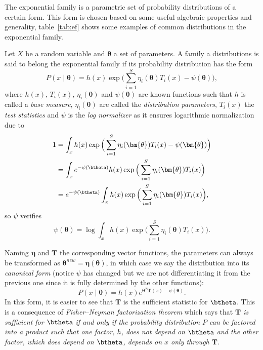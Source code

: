 
The exponential family is a parametric set of probability distributions of a certain form. This form is chosen based on some useful algebraic properties and generality, table~\ref{tab:ef} shows some examples of common distributions in the exponential family.

Let \(X\) be a random variable and \(\bm{\theta}\) a set of parameters. A family a distributions is said to belong the exponential family if its probability distribution has the form
\[
  P(x \mid \bm{\theta}) = h(x)\exp{\Big( \sum_{i=1}^{S} \eta_{i}(\bm{\theta})T_{i}(x) - \psi(\bm{\theta}) \Big)},
\]
where \(h(x)\), \(T_{i}(x)\), \(\eta_{i}(\bm{\theta})\) and \(\psi(\bm{\theta})\)  are known functions such that \(h\) is called a \emph{base measure}, \(\eta_{i}(\bm{\theta})\) are called the \emph{distribution parameters},  \(T_{i}(x)\) the \emph{test statistics} and \(\psi\) is the \emph{log normalizer} as it ensures logarithmic normalization due to
\[
  \begin{aligned}
    1 &= \int_{x}  h(x)\exp{\Big( \sum_{i=1}^{S} \eta_{i}(\bm{\theta})T_{i}(x) - \psi(\bm{\theta}) \Big)}\\
    &= \int_{x} e^{-\psi(\btheta)} h(x)\exp{\Big( \sum_{i=1}^{S} \eta_{i}(\bm{\theta})T_{i}(x) \Big)}\\
    &= e^{-\psi(\btheta)} \int_{x} h(x)\exp{\Big( \sum_{i=1}^{S} \eta_{i}(\bm{\theta})T_{i}(x) \Big)},
  \end{aligned}
\]
so \(\psi\) verifies
\[
      \psi(\bm{\theta}) = \log \int_{x} h(x) \exp \Big( \sum_{i=1}^{S} \eta_{i}(\bm{\theta})T_{i}(x) \Big).
\]

Naming \(\bm{\eta}\) and \(\bm{T}\) the corresponding vector functions, the parameters can always be transformed as \(\bm{\theta}^{new} = \bm{\eta}(\bm{\theta})\), in which case we say the distribution into its \emph{canonical form} (notice \(\psi\) has changed but we are not differentiating it from the previous one since it is fully determined by the other functions):
\[
  P(x \mid \bm{\theta}) = h(x) e^{\bm{\theta}^{T}\bm{T}(x) - \psi(\bm{\theta})}.
\]
In this form, it is easier to see that \(\bm{T}\) is the sufficient statistic for \(\btheta\). This is a consequence of \emph{Fisher–Neyman factorization theorem} which says that \textit{\(\bm{T}\) is sufficient for \(\btheta\)  if and only if the probability distribution \(P\)  can be factored into a product such that one factor, \(h\), does not depend on \(\btheta\)  and the other factor, which does depend on \(\btheta\), depends on \(x\)  only through \(\bm{T}\).}

